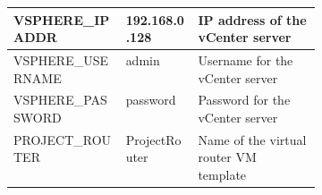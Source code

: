 \begin{table}[H]
\begin{tabular}{l l p{0.4\linewidth}}
        
        VSPHERE\_IPADDR     & 192.168.0.128    & IP address of the vCenter server                                                                                    \\            \hline
        
        VSPHERE\_USERNAME   & admin            & Username for the vCenter server                                                                                     \\            \hline
        
        VSPHERE\_PASSWORD   & password         & Password for the vCenter server                                                                                     \\            \hline
        
        PROJECT\_ROUTER     & ProjectRouter    & Name of the virtual router VM template                                                                              \\        
    \end{tabular}
\end{table}
